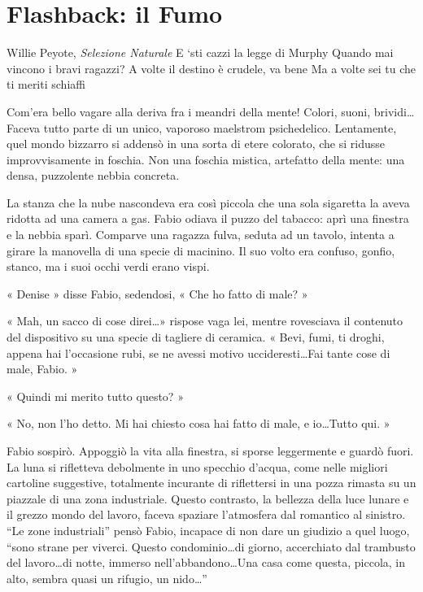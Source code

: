 \chapter{Flashback: il Fumo}

\begin{chapquote}{Willie Peyote, \textit{Selezione Naturale}}
	E `sti cazzi la legge di Murphy\newline
	Quando mai vincono i bravi ragazzi?\newline
	A volte il destino è crudele, va bene\newline
	Ma a volte sei tu che ti meriti schiaffi
\end{chapquote}


Com'era bello vagare alla deriva fra i meandri della mente! Colori, suoni, brividi\ldots \space Faceva tutto parte di un unico, vaporoso maelstrom psichedelico. Lentamente, quel mondo bizzarro si addensò in una sorta di etere colorato, che si ridusse improvvisamente in foschia. Non una foschia mistica, artefatto della mente: una densa, puzzolente nebbia concreta.

La stanza che la nube nascondeva era così piccola che una sola sigaretta la aveva ridotta ad una camera a gas. Fabio odiava il puzzo del tabacco: aprì una finestra e la nebbia sparì. Comparve una ragazza fulva, seduta ad un tavolo, intenta a girare la manovella di una specie di macinino. Il suo volto era confuso, gonfio, stanco, ma i suoi occhi verdi erano vispi.

« Denise » disse Fabio, sedendosi, « Che ho fatto di male? »

« Mah, un sacco di cose direi\ldots » rispose vaga lei, mentre rovesciava il contenuto del dispositivo su una specie di tagliere di ceramica. « Bevi, fumi, ti droghi, appena hai l'occasione rubi, se ne avessi motivo uccideresti\ldots Fai tante cose di male, Fabio. »

« Quindi mi merito tutto questo? »

« No, non l'ho detto. Mi hai chiesto cosa hai fatto di male, e io\ldots Tutto qui. »

Fabio sospirò. Appoggiò la vita alla finestra, si sporse leggermente e guardò fuori. La luna si rifletteva debolmente in uno specchio d'acqua, come nelle migliori cartoline suggestive, totalmente incurante di riflettersi in una pozza rimasta su un piazzale di una zona industriale. Questo contrasto, la bellezza della luce lunare e il grezzo mondo del lavoro, faceva spaziare l'atmosfera dal romantico al sinistro. ``Le zone industriali'' pensò Fabio, incapace di non dare un giudizio a quel luogo, ``sono strane per viverci. Questo condominio\ldots di giorno, accerchiato dal trambusto del lavoro\ldots di notte, immerso nell'abbandono\ldots Una casa come questa, piccola, in alto, sembra quasi un rifugio, un nido\ldots''

